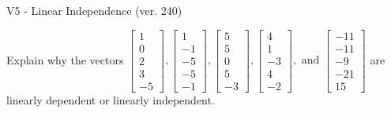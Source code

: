 \begin{exercise}
  \begin{exerciseTitle}V5 - Linear Independence (ver. 240)\end{exerciseTitle}
  \begin{exerciseStatement}
    Explain why the vectors \(\left[\begin{array}{r}
1 \\
0 \\
2 \\
3 \\
-5
\end{array}\right] , \left[\begin{array}{r}
1 \\
-1 \\
-5 \\
-5 \\
-1
\end{array}\right] , \left[\begin{array}{r}
5 \\
5 \\
0 \\
5 \\
-3
\end{array}\right] , \left[\begin{array}{r}
4 \\
1 \\
-3 \\
4 \\
-2
\end{array}\right] , \text{ and } \left[\begin{array}{r}
-11 \\
-11 \\
-9 \\
-21 \\
15
\end{array}\right]\) are linearly dependent or linearly independent.	



\end{exerciseStatement}
\end{exercise}
